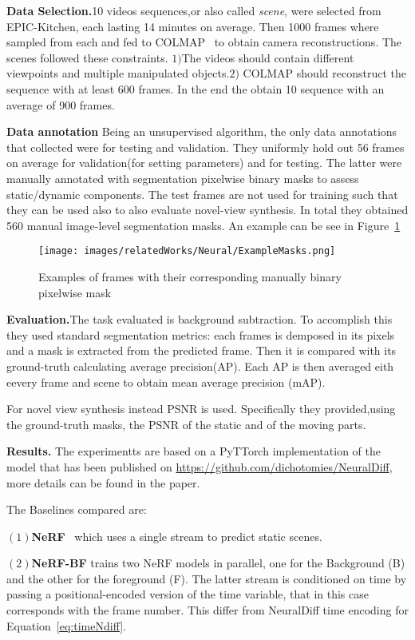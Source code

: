 \textbf{Data Selection.}10 videos sequences,or also called \textit{scene}, were selected from EPIC-Kitchen, each lasting 14 minutes
on average. Then 1000 frames where sampled from each and fed to COLMAP~\cite{colmap} to obtain
camera reconstructions. The scenes followed these constraints. $1)$The videos
should contain different viewpoints and multiple manipulated objects.$2)$ COLMAP should reconstruct
the sequence with at least 600 frames. In the end the obtain 10 sequence with an average of 900 frames.

\textbf{Data annotation}
Being an unsupervised algorithm, the only data annotations that collected were for testing and 
validation. They uniformly hold out 56 frames on average for validation(for setting parameters)
and for testing. The latter were manually annotated with segmentation pixelwise binary masks to assess static/dynamic components.
The test frames are not used for training such that they can be used also to also evaluate 
novel-view synthesis. In total they obtained 560 manual image-level segmentation masks. An example can
be see in Figure~\ref{fig:exMasks}
\begin{figure}
    \centering
    \texttt{[image: images/relatedWorks/Neural/ExampleMasks.png]} 
    \caption{Examples of frames with their corresponding manually binary pixelwise mask}\label{fig:exMasks}
\end{figure}

\textbf{Evaluation.}The task evaluated is background subtraction. To accomplish this they
used standard segmentation metrics: each frames is demposed in its pixels and a mask is 
extracted from the predicted frame. Then it is compared with its ground-truth calculating 
average precision(AP). Each AP is then averaged eith eevery frame and scene to obtain mean 
average precision (mAP).

For novel view synthesis instead PSNR is used. Specifically they provided,using the 
ground-truth masks, the PSNR of the static and of the moving parts.

\textbf{Results.} The experimentts are based on a PyTTorch implementation of the model
that has been published on \url{https://github.com/dichotomies/NeuralDiff}, more details 
can be found in the paper. 

The Baselines compared are:

$(1)$\textbf{NeRF}~\cite{nerf} which uses a single stream to predict static scenes.

$(2)$\textbf{NeRF-BF} trains two NeRF models in parallel, one for the Background (B) and the
other for the foreground (F). The latter stream is conditioned on time by passing a
positional-encoded version of the time variable, that in this case corresponds with 
the frame number. This differ from NeuralDiff time encoding for Equation~\ref{eq:timeNdiff}.

